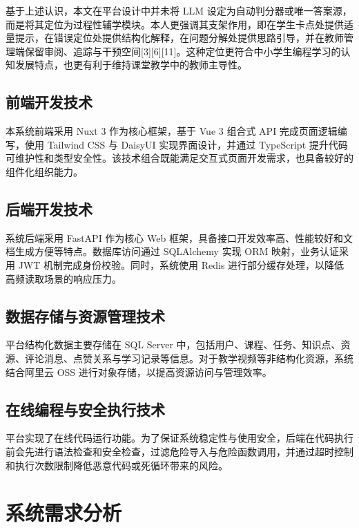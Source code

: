 基于上述认识，本文在平台设计中并未将 LLM 设定为自动判分器或唯一答案源，而是将其定位为过程性辅学模块。本人更强调其支架作用，即在学生卡点处提供适量提示，在错误定位处提供结构化解释，在问题分解处提供思路引导，并在教师管理端保留审阅、追踪与干预空间{[}3{]}{[}6{]}{[}11{]}。这种定位更符合中小学生编程学习的认知发展特点，也更有利于维持课堂教学中的教师主导性。

\section{前端开发技术}\label{ux524dux7aefux5f00ux53d1ux6280ux672f}

本系统前端采用 Nuxt 3 作为核心框架，基于 Vue 3 组合式 API 完成页面逻辑编写，使用 Tailwind CSS 与 DaisyUI 实现界面设计，并通过 TypeScript 提升代码可维护性和类型安全性。该技术组合既能满足交互式页面开发需求，也具备较好的组件化组织能力。

\section{后端开发技术}\label{ux540eux7aefux5f00ux53d1ux6280ux672f}

系统后端采用 FastAPI 作为核心 Web 框架，具备接口开发效率高、性能较好和文档生成方便等特点。数据库访问通过 SQLAlchemy 实现 ORM 映射，业务认证采用 JWT 机制完成身份校验。同时，系统使用 Redis 进行部分缓存处理，以降低高频读取场景的响应压力。

\section{数据存储与资源管理技术}\label{ux6570ux636eux5b58ux50a8ux4e0eux8d44ux6e90ux7ba1ux7406ux6280ux672f}

平台结构化数据主要存储在 SQL Server 中，包括用户、课程、任务、知识点、资源、评论消息、点赞关系与学习记录等信息。对于教学视频等非结构化资源，系统结合阿里云 OSS 进行对象存储，以提高资源访问与管理效率。

\section{在线编程与安全执行技术}\label{ux5728ux7ebfux7f16ux7a0bux4e0eux5b89ux5168ux6267ux884cux6280ux672f}

平台实现了在线代码运行功能。为了保证系统稳定性与使用安全，后端在代码执行前会先进行语法检查和安全检查，过滤危险导入与危险函数调用，并通过超时控制和执行次数限制降低恶意代码或死循环带来的风险。

\chapter{系统需求分析}\label{ux7cfbux7edfux9700ux6c42ux5206ux6790}

